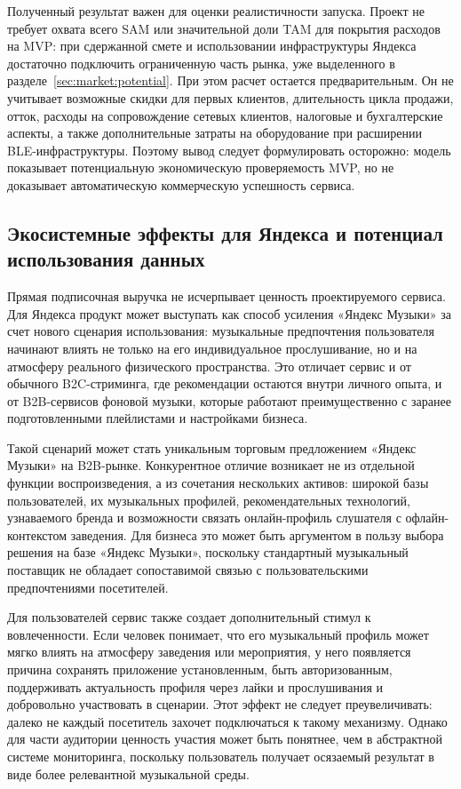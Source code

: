 Полученный результат важен для оценки реалистичности запуска. Проект не требует охвата всего SAM или значительной доли TAM для покрытия расходов на MVP: при сдержанной смете и использовании инфраструктуры Яндекса достаточно подключить ограниченную часть рынка, уже выделенного в разделе~\ref{sec:market:potential}. При этом расчет остается предварительным. Он не учитывает возможные скидки для первых клиентов, длительность цикла продажи, отток, расходы на сопровождение сетевых клиентов, налоговые и бухгалтерские аспекты, а также дополнительные затраты на оборудование при расширении BLE-инфраструктуры. Поэтому вывод следует формулировать осторожно: модель показывает потенциальную экономическую проверяемость MVP, но не доказывает автоматическую коммерческую успешность сервиса.

\subsection{Экосистемные эффекты для Яндекса и потенциал использования данных}
\label{subsec:service:monetization:ecosystem}

Прямая подписочная выручка не исчерпывает ценность проектируемого сервиса. Для Яндекса продукт может выступать как способ усиления «Яндекс Музыки» за счет нового сценария использования: музыкальные предпочтения пользователя начинают влиять не только на его индивидуальное прослушивание, но и на атмосферу реального физического пространства. Это отличает сервис и от обычного B2C-стриминга, где рекомендации остаются внутри личного опыта, и от B2B-сервисов фоновой музыки, которые работают преимущественно с заранее подготовленными плейлистами и настройками бизнеса.

Такой сценарий может стать уникальным торговым предложением «Яндекс Музыки» на B2B-рынке. Конкурентное отличие возникает не из отдельной функции воспроизведения, а из сочетания нескольких активов: широкой базы пользователей, их музыкальных профилей, рекомендательных технологий, узнаваемого бренда и возможности связать онлайн-профиль слушателя с офлайн-контекстом заведения. Для бизнеса это может быть аргументом в пользу выбора решения на базе «Яндекс Музыки», поскольку стандартный музыкальный поставщик не обладает сопоставимой связью с пользовательскими предпочтениями посетителей.

Для пользователей сервис также создает дополнительный стимул к вовлеченности. Если человек понимает, что его музыкальный профиль может мягко влиять на атмосферу заведения или мероприятия, у него появляется причина сохранять приложение установленным, быть авторизованным, поддерживать актуальность профиля через лайки и прослушивания и добровольно участвовать в сценарии. Этот эффект не следует преувеличивать: далеко не каждый посетитель захочет подключаться к такому механизму. Однако для части аудитории ценность участия может быть понятнее, чем в абстрактной системе мониторинга, поскольку пользователь получает осязаемый результат в виде более релевантной музыкальной среды.

